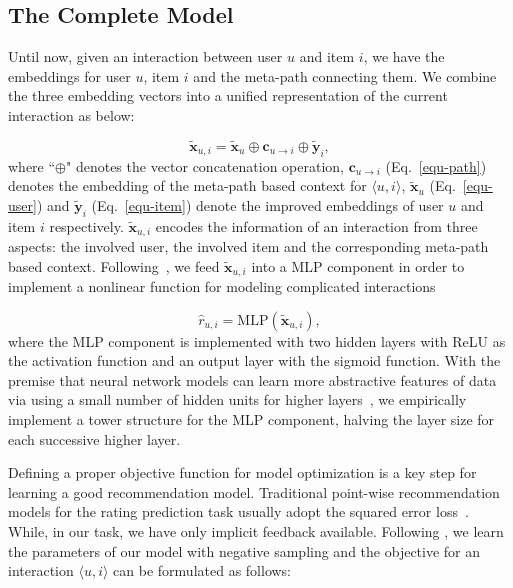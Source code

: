 \subsection{The Complete Model}
Until now, given an interaction between user $u$ and item $i$, we have the embeddings for user $u$, item $i$ and the meta-path connecting them.
We combine the three embedding vectors into a unified representation of the current interaction as below:

\begin{equation}\label{equ-model}
\widetilde{\mathbf{x}}_{u,i} = \tilde{\mathbf{x}}_u \oplus \mathbf{c}_{u \rightarrow i} \oplus \tilde{\mathbf{y}}_i,
\end{equation}
where ``$\oplus$" denotes the vector concatenation operation, $\mathbf{c}_{u \rightarrow i}$  (Eq.~\ref{equ-path}) denotes the embedding  of the meta-path based context for $\langle u, i \rangle$, $\tilde{\mathbf{x}}_u$ (Eq.~\ref{equ-user}) and $\tilde{\mathbf{y}}_i$ (Eq.~\ref{equ-item}) denote the improved embeddings of user $u$ and item $i$ respectively.
$\widetilde{\mathbf{x}}_{u,i}$ encodes the information of an interaction from three aspects: the involved user, the involved item and the corresponding meta-path based context.
Following~\cite{he2017neural}, we feed $\widetilde{\mathbf{x}}_{u,i}$ into a MLP component in order to implement a nonlinear  function for modeling complicated interactions

\begin{equation} \label{equ-predict}
\hat{r}_{u,i} = \text{MLP}(\widetilde{\mathbf{x}}_{u,i}),
\end{equation}
where the MLP component is implemented with two hidden layers with ReLU as the activation function and an output layer with the sigmoid function.
With the premise that neural network models can learn more abstractive features of data via using a small number of hidden units for higher layers~\cite{he2016deep}, we empirically implement a tower structure for the MLP component, halving the layer size for each successive higher layer.

Defining a proper objective function for model optimization is a key step for learning a good recommendation model. Traditional point-wise recommendation models  for the rating prediction task usually adopt the squared error loss~\cite{koren2009matrix}. While, in our task, we have only implicit feedback available.  Following \cite{he2017neural,tang2015line}, we learn the parameters of our model with negative sampling and the objective for an interaction $\langle u, i \rangle$ can be formulated as follows:

